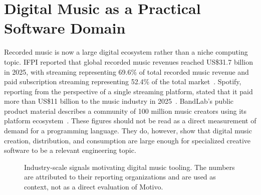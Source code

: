 \section{Digital Music as a Practical Software Domain}\label{sec:digital-music-domain}

Recorded music is now a large digital ecosystem rather than a niche computing topic.
IFPI reported that global recorded music revenues reached US\$31.7 billion in 2025, with streaming representing 69.6\%
of total recorded music revenue and paid subscription streaming representing 52.4\% of the total
market~\cite{IFPI_2026}.
Spotify, reporting from the perspective of a single streaming platform, stated that it paid more than US\$11 billion to
the music industry in 2025~\cite{Spotify_2026_Payouts}.
BandLab's public product material describes a community of 100 million music creators using its platform
ecosystem~\cite{BandLab_2026}.
These figures should not be read as a direct measurement of demand for a programming language.
They do, however, show that digital music creation, distribution, and consumption are large enough for specialized
creative software to be a relevant engineering topic.

\begin{figure}[htbp]
  \centering
  \caption{Industry-scale signals motivating digital music tooling.
    The numbers are attributed to their reporting organizations and are used as context, not as a direct evaluation of
  Motivo.}\label{fig:industry-context}
\end{figure}

